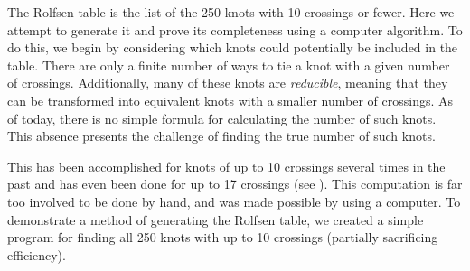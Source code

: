 \begin{paper}

The Rolfsen table is the list of the 250 knots with 10 crossings or fewer.
Here we attempt to generate it and prove its completeness using a computer
algorithm.
To do this, we begin by considering which knots could potentially be included in
the table.
There are only a finite number of ways to tie a knot with a given number of
crossings.
Additionally, many of these knots are \textit{reducible}, meaning that they can
be transformed into equivalent knots with a smaller number of crossings.
As of today, there is no simple formula for calculating the number of such
knots.
This absence presents the challenge of finding the true number of such knots.

This has been accomplished for knots of up to 10 crossings several times in the
past and has even been done for up to 17 crossings (see \cite{htw}).
This computation is far too involved to be done by hand, and was made possible
by using a computer.
To demonstrate a method of generating the Rolfsen table, we created a simple
program for finding all 250 knots with up to 10 crossings (partially sacrificing
efficiency).


\end{paper}
